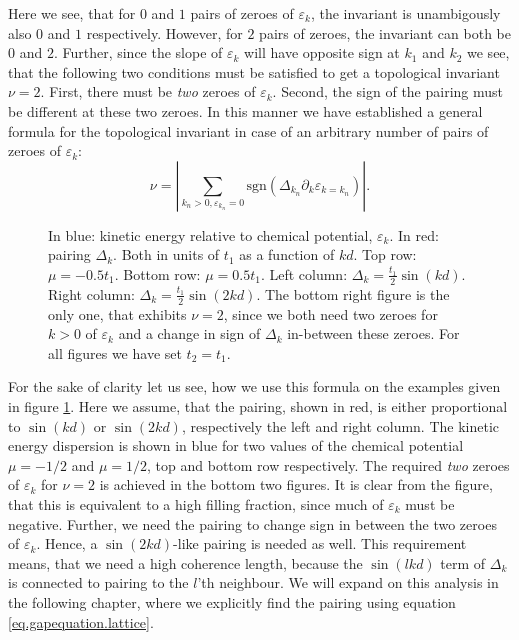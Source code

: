 Here we see, that for $0$ and $1$ pairs of zeroes of $\varepsilon_k$, the invariant is unambigously also $0$ and $1$ respectively. However, for $2$ pairs of zeroes, the invariant can both be $0$ and $2$. Further, since the slope of $\varepsilon_k$ will have opposite sign at $k_1$ and $k_2$ we see, that the following two conditions must be satisfied to get a topological invariant $\nu = 2$. First, there must be \textit{two} zeroes of $\varepsilon_k$. Second, the sign of the pairing must be different at these two zeroes. In this manner we have established a general formula for the topological invariant in case of an arbitrary number of pairs of zeroes of $\varepsilon_k$:
\begin{equation}
\nu = \left|\sum_{k_n > 0, \varepsilon_{k_n} = 0} \text{sgn}\left(\Delta_{k_n}\partial_k\varepsilon_{k = k_n}\right)\right|.
\label{eq.topologicalinvariant}
\end{equation} 

\begin{figure}
\begin{center}

\caption{In blue: kinetic energy relative to chemical potential, $\varepsilon_k$. In red: pairing $\Delta_k$. Both in units of $t_1$ as a function of $kd$. Top row: $\mu = -0.5 t_1$. Bottom row: $\mu = 0.5 t_1$. Left column: $\Delta_k = \frac{t_1}{2}\sin(kd)$. Right column: $\Delta_k = \frac{t_1}{2}\sin(2kd)$. The bottom right figure is the only one, that exhibits $\nu = 2$, since we both need two zeroes for $k >0$ of $\varepsilon_k$ and a change in sign of $\Delta_k$ in-between these zeroes. For all figures we have set $t_2 = t_1$. }
\label{fig.dispersions.lattice}
\end{center}
\end{figure}

For the sake of clarity let us see, how we use this formula on the examples given in figure \ref{fig.dispersions.lattice}. Here we assume, that the pairing, shown in red, is either proportional to $\sin(kd)$ or $\sin(2kd)$, respectively the left and right column. The kinetic energy dispersion is shown in blue for two values of the chemical potential $\mu = -1/2$ and $\mu = 1/2$, top and bottom row respectively. The required \textit{two} zeroes of $\varepsilon_k$ for $\nu = 2$ is achieved in the bottom two figures. It is clear from the figure, that this is equivalent to a high filling fraction, since much of $\varepsilon_k$ must be negative. Further, we need the pairing to change sign in between the two zeroes of $\varepsilon_k$. Hence, a $\sin(2kd)$-like pairing is needed as well. This requirement means, that we need a high coherence length, because the $\sin(lkd)$ term of $\Delta_k$ is connected to pairing to the $l$'th neighbour. We will expand on this analysis in the following chapter, where we explicitly find the pairing using equation \eqref{eq.gapequation.lattice}.

